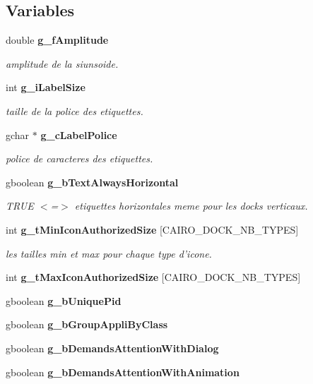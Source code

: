 \subsection*{Variables}
\begin{CompactItemize}
\item 
double {\bf g\_\-f\-Amplitude}
\begin{CompactList}\small\item\em amplitude de la siunsoide. \item\end{CompactList}\item 
int {\bf g\_\-i\-Label\-Size}
\begin{CompactList}\small\item\em taille de la police des etiquettes. \item\end{CompactList}\item 
gchar $\ast$ {\bf g\_\-c\-Label\-Police}
\begin{CompactList}\small\item\em police de caracteres des etiquettes. \item\end{CompactList}\item 
gboolean {\bf g\_\-b\-Text\-Always\-Horizontal}
\begin{CompactList}\small\item\em TRUE $<$=$>$ etiquettes horizontales meme pour les docks verticaux. \item\end{CompactList}\item 
int {\bf g\_\-t\-Min\-Icon\-Authorized\-Size} [CAIRO\_\-DOCK\_\-NB\_\-TYPES]
\begin{CompactList}\small\item\em les tailles min et max pour chaque type d'icone. \item\end{CompactList}\item 
int {\bf g\_\-t\-Max\-Icon\-Authorized\-Size} [CAIRO\_\-DOCK\_\-NB\_\-TYPES]
\item 
gboolean {\bf g\_\-b\-Unique\-Pid}
\item 
gboolean {\bf g\_\-b\-Group\-Appli\-By\-Class}
\item 
gboolean {\bf g\_\-b\-Demands\-Attention\-With\-Dialog}
\item 
gboolean {\bf g\_\-b\-Demands\-Attention\-With\-Animation}
\end{CompactItemize}


